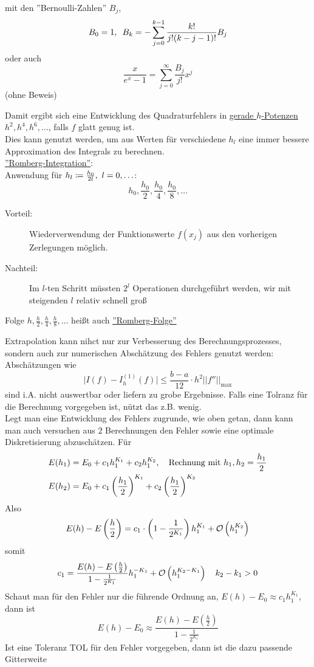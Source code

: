 \documentclass[../Skript.tex]{subfiles}
\begin{document}
{\begin{theorem}
    mit den ''Bernoulli-Zahlen'' $B_j$, \[
        B_0 = 1, \hspace{.5em} B_k = -\sum_{j=0}^{k-1}\frac{k!}{j!(k-j-1)!}B_j
    \]
    oder auch \[
        \frac{x}{e^x - 1} = \sum_{j=0}^\infty \frac{B_j}{j!}x^j
    \]
    (ohne Beweis)
\end{theorem}

Damit ergibt sich eine Entwicklung des Quadraturfehlers in 
\underline{gerade
 $h$-Potenzen} $h^2, h^4, h^6, \dots$, falls $f$ glatt genug ist.\\
Dies kann genutzt werden, um aus Werten für verschiedene $h_l$ 
eine immer bessere Approximation des Integrals zu berechnen.\\
\underline{''Romberg-Integration''}:\\
Anwendung für $h_l \coloneqq \frac{h_0}{2l}, \ \igb l 0 {}$:\[
    h_0,\frac{h_0}{2},\frac{h_0}{4},\frac{h_0}{8},\dots\]
\begin{description}
    \item[Vorteil:] Wiederverwendung der Funktionswerte $f(x_j)$ aus den 
    vorherigen Zerlegungen möglich.
    \item[Nachteil:] Im $l$-ten Schritt müssten $2^l$ Operationen 
    durchgeführt 
    werden, wir mit steigenden $l$ relativ schnell groß 
\end{description} 
\begin{remark}
    Folge $h,\frac{h}{2},\frac{h}{4},\frac{h}{8},\dots$ heißt auch 
    \underline{
        ''Romberg-Folge''
    }
\end{remark}

Extrapolation kann nihct nur zur Verbesserung des Berechnungsprozesses, 
sondern auch zur numerischen Abschätzung des Fehlers genutzt werden:\\
Abschätzungen wie\[
\vert I(f)-I_h^{(1)}(f)\vert \leq\frac{b-a}{12}\cdot h^2\vert\vert 
f''\vert\vert_{\max}
\]
sind i.A. nicht auswertbar oder liefern zu grobe Ergebnisse. Falls eine 
Tolranz für die Berechnung vorgegeben ist, nützt das z.B. wenig. \\
Legt man eine Entwicklung des Fehlers zugrunde, wie oben getan, dann kann 
man auch versuchen aus \(2\) Berechnungen den Fehler sowie eine optimale 
Diskretisierung abzuschätzen. 
Für \begin{align*}
    E(h_1) &= E_0 + c_1h_1^{K_1}+c_2h_1^{K_2}, \hspace{1em} \text{Rechnung 
    mit }h_1,
    h_2 = \frac{h_1}{2}\\
    E(h_2) &= E_0 + c_1\left(\frac{h_1}{2}\right)^{K_1} + 
    c_2\left(\frac{h_1}{2}\right)^{K_2}
\end{align*}
Also \[
    E(h) - E\left(\frac{h}{2}\right) = c_1\cdot\left(1-\frac{1}{2^{K_1}}
    \right) h_1^{K_1} + \calO{h_1^{K_2}}\]
somit \[
    c_1 = \frac{E(h) - E\left(\frac{h}{2}\right)}{1-\frac{1}
    {2^{K_1}}}h_1^{-K_1} + \calO{h_1^{K_2-K_1}}\largespace k_2-k_1 > 0\]
Schaut man für den Fehler nur die führende Ordnung an, $E(h) - E_0 
\approx c_1h_1^{K_1}$, 
dann ist \[
    E(h) - E_0 \approx \frac{E(h) - E\left(\frac{h}{2}\right)}{1-\frac{1}
    {2^{K_1}}}\] 
Ist eine Toleranz TOL für den Fehler vorgegeben, dann ist die dazu 
passende Gitterweite
\def\hopt{\ensuremath{h_{\text{opt}}}}

}
\end{document}
